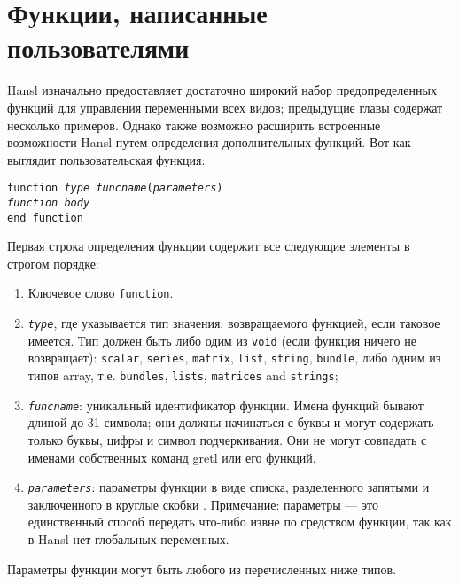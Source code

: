 \chapter{Функции, написанные пользователями}
\label{chap:user-funcs}

Hansl изначально предоставляет достаточно широкий набор
предопределенных функций для управления переменными всех видов;
предыдущие главы содержат несколько примеров. Однако также возможно
расширить встроенные возможности Hansl путем определения
дополнительных функций. Вот как выглядит пользовательская функция:

\begin{flushleft}
\texttt{function \emph{type} \emph{funcname}(\emph{parameters})}\\
   \quad \texttt{\emph{function body}}\\
\texttt{end function}
\end{flushleft}
Первая строка определения функции содержит все следующие элементы в
строгом порядке:
\begin{enumerate}
\item  Ключевое слово \texttt{function}.
\item \texttt{\emph{type}}, где указывается тип значения,
  возвращаемого функцией, если таковое имеется. Тип должен быть либо
  одим из \texttt{void} (если функция ничего не возвращает):
  \texttt{scalar}, \texttt{series}, \texttt{matrix}, \texttt{list},
  \texttt{string}, \texttt{bundle}, либо одним из типов array,
  т.е. \texttt{bundles}, \texttt{lists}, \texttt{matrices} and
  \texttt{strings};
\item \texttt{\emph{funcname}}: уникальный идентификатор
  функции. Имена функций бывают длиной до 31 символа; они должны
  начинаться с буквы и могут содержать только буквы, цифры и символ
  подчеркивания. Они не могут совпадать с именами собственных команд
  gretl или его функций.
\item \texttt{\emph{parameters}}: параметры функции в виде списка,
  разделенного запятыми и заключенного в круглые скобки . Примечание:
  параметры --- это единственный способ передать что-либо извне по
  средством функции, так как в Hansl нет глобальных переменных.
\end{enumerate}

Параметры функции могут быть любого из перечисленных ниже типов.

